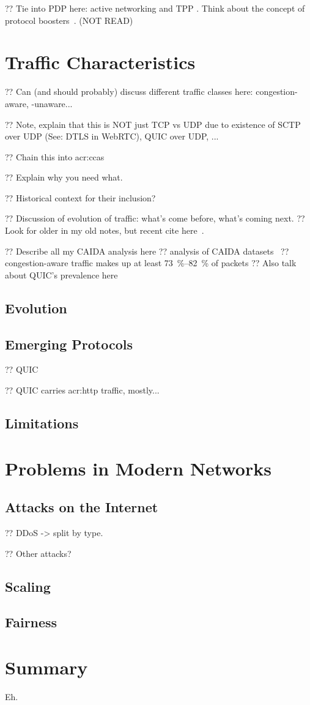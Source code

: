?? Tie into PDP here: active networking and TPP . Think about the concept of protocol boosters~\parencite{DBLP:journals/jsac/FeldmeierMSBMR98}. (NOT READ)

\section{Traffic Characteristics}

?? Can (and should probably) discuss different traffic classes here: congestion-aware, -unaware...

?? Note, explain that this is NOT just TCP vs UDP due to existence of SCTP over UDP (See: DTLS in WebRTC), QUIC over UDP, ...

?? Chain this into \glspl{acr:cca}

?? Explain why you need what.

?? Historical context for their inclusion?

?? Discussion of evolution of traffic: what's come before, what's coming next.
?? Look for older in my old notes, but recent cite here~\parencite{DBLP:conf/anrw/BauerJHBC21}.

?? Describe all my CAIDA analysis here
?? analysis of CAIDA datasets~\parencite{caida-2018-passive}
?? congestion-aware traffic makes up at least \qtyrange{73}{82}{\percent} of packets
?? Also talk about QUIC's prevalence here

\subsection{Evolution}

\subsection{Emerging Protocols}

?? QUIC~\parencite{DBLP:conf/sigcomm/LangleyRWVKZYKS17}

?? QUIC carries \gls{acr:http} traffic, mostly...

\subsection{Limitations}

\section{Problems in Modern Networks}\label{sec:problems-in-modern-networks}

\subsection{Attacks on the Internet}

?? DDoS -> split by type.

?? Other attacks?

\subsection{Scaling}

\subsection{Fairness}

\section{Summary}
Eh.
